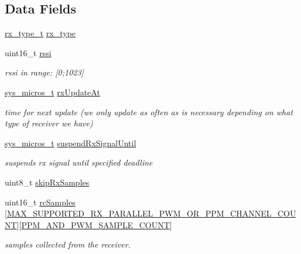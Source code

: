 \subsection*{Data Fields}
\begin{DoxyCompactItemize}
\item 
\hyperlink{rx_2rx_8h_a9af89ac92f13acbf1a8bc349ce21ba65}{rx\+\_\+type\+\_\+t} \hyperlink{structrx_af96957ebd169646f00b8b79314abd0f1}{rx\+\_\+type}
\item 
uint16\+\_\+t \hyperlink{structrx_a155f20d2c3e9ded0c967dfbea2a5f696}{rssi}
\begin{DoxyCompactList}\small\item\em rssi in range\+: \mbox{[}0;1023\mbox{]} \end{DoxyCompactList}\item 
\hyperlink{system__calls_8h_a1374d627d8a03b6d9ebb6707c67cf2ff}{sys\+\_\+micros\+\_\+t} \hyperlink{structrx_a4904303fe43a4e45a4aca28807d57cc2}{rx\+Update\+At}
\begin{DoxyCompactList}\small\item\em time for next update (we only update as often as is necessary depending on what type of receiver we have) \end{DoxyCompactList}\item 
\hyperlink{system__calls_8h_a1374d627d8a03b6d9ebb6707c67cf2ff}{sys\+\_\+micros\+\_\+t} \hyperlink{structrx_a0cb90543d6f91fc3640753d1b6d177d8}{suspend\+Rx\+Signal\+Until}
\begin{DoxyCompactList}\small\item\em suspends rx signal until specified deadline \end{DoxyCompactList}\item 
uint8\+\_\+t \hyperlink{structrx_aa4507aca657ffcb588ac40316458053f}{skip\+Rx\+Samples}
\item 
uint16\+\_\+t \hyperlink{structrx_adcab2f3363a4181c1e0644f71fc02d63}{rc\+Samples} \mbox{[}\hyperlink{rx_2rx_8h_a7d202f61d94bda7bc3fe066274f6efcc}{M\+A\+X\+\_\+\+S\+U\+P\+P\+O\+R\+T\+E\+D\+\_\+\+R\+X\+\_\+\+P\+A\+R\+A\+L\+L\+E\+L\+\_\+\+P\+W\+M\+\_\+\+O\+R\+\_\+\+P\+P\+M\+\_\+\+C\+H\+A\+N\+N\+E\+L\+\_\+\+C\+O\+U\+N\+T}\mbox{]}\mbox{[}\hyperlink{rx_2rx_8h_a50095c63e67d3bd41a3f6161704fbf28}{P\+P\+M\+\_\+\+A\+N\+D\+\_\+\+P\+W\+M\+\_\+\+S\+A\+M\+P\+L\+E\+\_\+\+C\+O\+U\+N\+T}\mbox{]}
\begin{DoxyCompactList}\small\item\em samples collected from the receiver. \end{DoxyCompactList}\item 

\end{DoxyCompactItemize}
